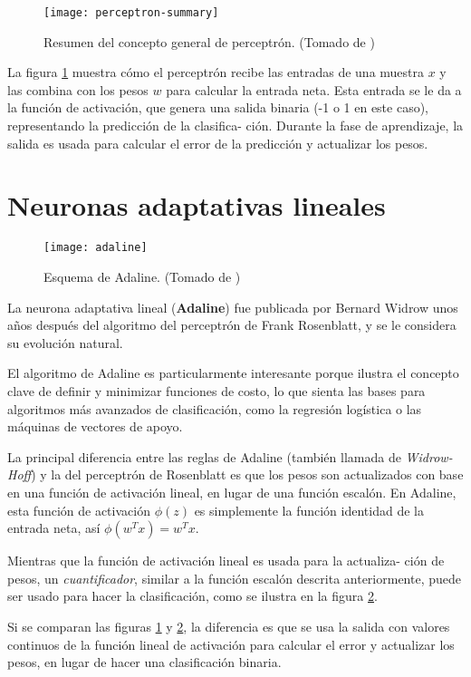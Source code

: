 \begin{figure}[H]
  \texttt{[image: perceptron-summary]} \centering
  \caption{Resumen del concepto general de perceptrón. (Tomado de
    \cite{python})}
  \label{fig:perceptron}
\end{figure}

La figura \ref{fig:perceptron} muestra cómo el perceptrón recibe las
entradas de una muestra $x$ y las combina con los pesos $w$ para
calcular la entrada neta.  Esta entrada se le da a la función de
activación, que genera una salida binaria (-1 o 1 en este caso),
representando la predicción de la clasifica- ción. Durante la fase de
aprendizaje, la salida es usada para calcular el error de la
predicción y actualizar los pesos.

\section{Neuronas adaptativas lineales}

\begin{figure}[H]
  \texttt{[image: adaline]} \centering
  \caption{Esquema de Adaline. (Tomado de \cite{python})}
  \label{fig:adaline}
\end{figure}

La neurona adaptativa lineal (\textbf{Adaline}) fue publicada por
Bernard Widrow \cite{adaline} unos años después del algoritmo del
perceptrón de Frank Rosenblatt, y se le considera su evolución natural.

El algoritmo de Adaline es particularmente interesante porque ilustra
el concepto clave de definir y minimizar funciones de costo, lo que
sienta las bases para algoritmos más avanzados de clasificación, como
la regresión logística o las máquinas de vectores de apoyo.

La principal diferencia entre las reglas de Adaline (también llamada
de \textit{Widrow-Hoff}) y la del perceptrón de Rosenblatt es que los
pesos son actualizados con base en una función de activación lineal,
en lugar de una función escalón. En Adaline, esta función de
activación $\phi (z)$ es simplemente la función identidad de la
entrada neta, así $\phi (w^T x) = w^T x$.

Mientras que la función de activación lineal es usada para la
actualiza- ción de pesos, un \textit{cuantificador}, similar a la
función escalón descrita anteriormente, puede ser usado para hacer la
clasificación, como se ilustra en la figura \ref{fig:adaline}.

Si se comparan las figuras \ref{fig:perceptron} y
\ref{fig:adaline}, la diferencia es que se usa la salida con valores
continuos de la función lineal de activación para calcular el error y
actualizar los pesos, en lugar de hacer una clasificación binaria.


